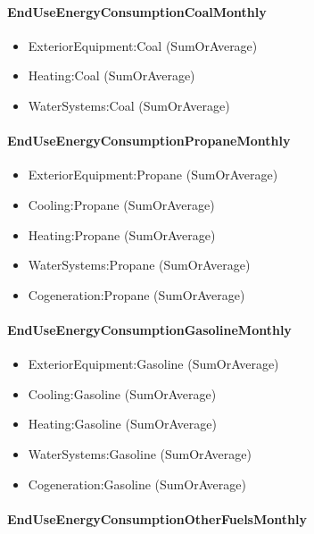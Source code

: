 \paragraph{EndUseEnergyConsumptionCoalMonthly}\label{enduseenergyconsumptioncoalmonthly}

\begin{itemize}
\item
  ExteriorEquipment:Coal (SumOrAverage)
\item
  Heating:Coal (SumOrAverage)
\item
  WaterSystems:Coal (SumOrAverage)
\end{itemize}

\paragraph{EndUseEnergyConsumptionPropaneMonthly}\label{enduseenergyconsumptionpropanemonthly}

\begin{itemize}
\item
  ExteriorEquipment:Propane (SumOrAverage)
\item
  Cooling:Propane (SumOrAverage)
\item
  Heating:Propane (SumOrAverage)
\item
  WaterSystems:Propane (SumOrAverage)
\item
  Cogeneration:Propane (SumOrAverage)
\end{itemize}

\paragraph{EndUseEnergyConsumptionGasolineMonthly}\label{enduseenergyconsumptiongasolinemonthly}

\begin{itemize}
\item
  ExteriorEquipment:Gasoline (SumOrAverage)
\item
  Cooling:Gasoline (SumOrAverage)
\item
  Heating:Gasoline (SumOrAverage)
\item
  WaterSystems:Gasoline (SumOrAverage)
\item
  Cogeneration:Gasoline (SumOrAverage)
\end{itemize}

\paragraph{EndUseEnergyConsumptionOtherFuelsMonthly}\label{enduseenergyconsumptionotherfuelsmonthly}

